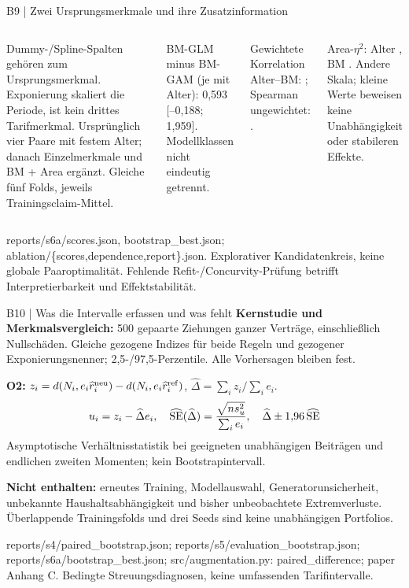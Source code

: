 \documentclass[aspectratio=169,11pt]{beamer}
\newcommand{\source}[1]{\vfill{\fontsize{6.5}{7.4}\selectfont\color{muted}#1\par}}
\newcommand{\smalltext}{\fontsize{9}{11.3}\selectfont}
\begin{document}
\begin{frame}[t]{B9 | Zwei Ursprungsmerkmale und ihre Zusatzinformation}
\begin{columns}[T,onlytextwidth]
{\smalltext\AllFeatureTable}\par\medskip
\smalltext Dummy-/Spline-Spalten gehören zum Ursprungsmerkmal.
Exponierung skaliert die Periode, ist kein drittes Tarifmerkmal.
\smalltext Ursprünglich vier Paare mit festem Alter;
danach Einzelmerkmale und BM + Area ergänzt.
Gleiche fünf Folds, jeweils Trainingsclaim-Mittel.\par\medskip
BM-GLM minus BM-GAM (je mit Alter):
0,593 [--0,188; 1,959]. Modellklassen nicht eindeutig getrennt.\par\medskip
Gewichtete Korrelation Alter--BM: \AgeBMRho;
Spearman ungewichtet: \AgeBMRank.\par\smallskip
Area-$\eta^2$: Alter \AreaAgeEta, BM \AreaBMEta.
Andere Skala; kleine Werte beweisen keine Unabhängigkeit oder stabileren Effekte.
\end{columns}
\source{reports/s6a/scores.json, bootstrap\_best.json; ablation/\{scores,dependence,report\}.json.
Explorativer Kandidatenkreis, keine globale Paaroptimalität. Fehlende Refit-/Concurvity-Prüfung betrifft Interpretierbarkeit und Effektstabilität.}
\end{frame}

\begin{frame}[t]{B10 | Was die Intervalle erfassen und was fehlt}
\smalltext
\textbf{Kernstudie und Merkmalsvergleich:}
500 gepaarte Ziehungen ganzer Verträge, einschließlich Nullschäden.
Gleiche gezogene Indizes für beide Regeln und gezogener Exponierungsnenner;
2,5-/97,5-Perzentile. Alle Vorhersagen bleiben fest.\par\medskip
\textbf{O2:} $z_i=d(N_i,e_i\widehat r_i^{\rm neu})-d(N_i,e_i\widehat r_i^{\rm ref})$,
$\widehat\Delta=\sum_i z_i/\sum_i e_i$.
\[
u_i=z_i-\widehat\Delta e_i,\quad
\widehat{\rm SE}(\widehat\Delta)=\frac{\sqrt{n s_u^2}}{\sum_i e_i},\quad
\widehat\Delta\pm1{,}96\,\widehat{\rm SE}
\]
Asymptotische Verhältnisstatistik bei geeigneten unabhängigen Beiträgen und endlichen zweiten Momenten;
kein Bootstrapintervall.\par\medskip
\textbf{Nicht enthalten:} erneutes Training, Modellauswahl, Generatorunsicherheit,
unbekannte Haushaltsabhängigkeit und bisher unbeobachtete Extremverluste.
Überlappende Trainingsfolds und drei Seeds sind keine unabhängigen Portfolios.
\source{reports/s4/paired\_bootstrap.json; reports/s5/evaluation\_bootstrap.json; reports/s6a/bootstrap\_best.json;
src/augmentation.py: paired\_difference; paper Anhang C. Bedingte Streuungsdiagnosen, keine umfassenden Tarifintervalle.}
\end{frame}
\end{document}
